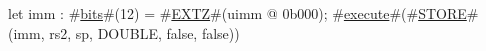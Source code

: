 let imm : #\hyperref[sailRISCVzbits]{bits}#(12) = #\hyperref[sailRISCVzEXTZ]{EXTZ}#(uimm @ 0b000);
#\hyperref[sailRISCVzexecute]{execute}#(#\hyperref[sailRISCVzSTORE]{STORE}#(imm, rs2, sp, DOUBLE, false, false))
